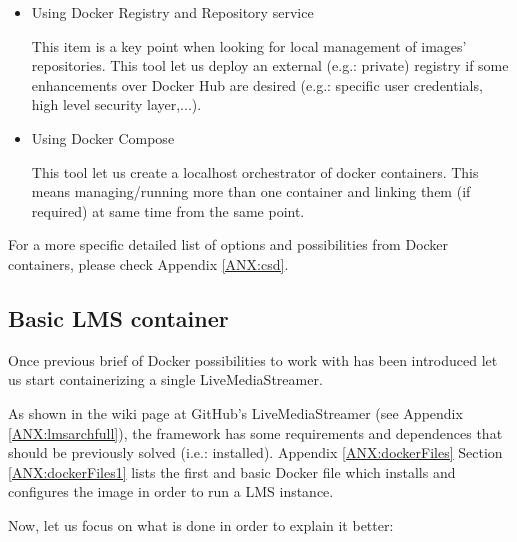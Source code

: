 {\begin{itemize}
\begin{itemize}
	It is a public registry of Docker images' repositories (there are also private ones with specific paying plans) from Docker official site. There is a list of basic (e.g.: CentOS, Ubuntu, Debian, ...) and complex (e.g.: CentOs with Nginx, Ubuntu with Nginx and Wordpress, Debian with Node.js and MongoDB, ...) containers containing clean and/or OS environments. 
	
	\item Using Docker Registry and Repository service

	This item is a key point when looking for local management of images' repositories. This tool let us deploy an external (e.g.: private) registry if some enhancements over Docker Hub are desired (e.g.: specific user credentials, high level security layer,...).
	
	\item Using Docker Compose
	
	This tool let us create a localhost orchestrator of docker containers. This means managing/running more than one container and linking them (if required) at same time from the same point.
	
	\end{itemize}
\end{itemize}}

For a more specific detailed list of options and possibilities from Docker containers, please check Appendix \ref{ANX:csd}.

\subsection{Basic LMS container}

Once previous brief of Docker possibilities to work with has been introduced let us start containerizing a single LiveMediaStreamer.

As shown in the wiki page at GitHub's LiveMediaStreamer (see Appendix \ref{ANX:lmsarchfull}), the framework has some requirements and dependences that should be previously solved (i.e.: installed). Appendix \ref{ANX:dockerFiles} Section \ref{ANX:dockerFiles1} lists the first and basic Docker file which installs and configures the image in order to run a LMS instance. 

Now, let us focus on what is done in order to explain it better: 

